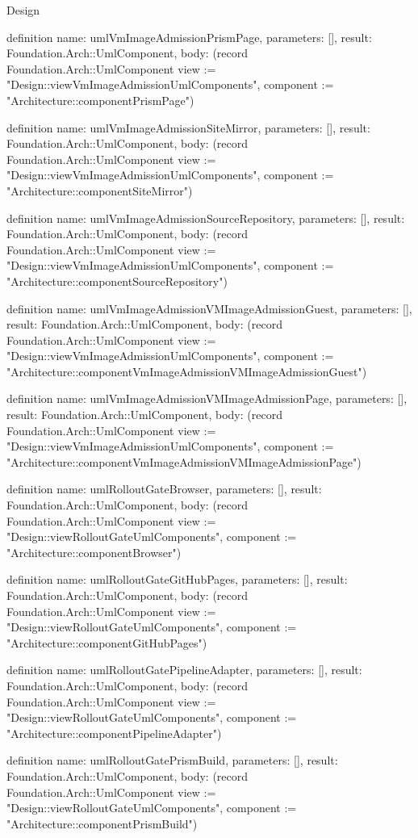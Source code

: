 \begin{lexlean}{Design}
\begin{semanticmodule}
definition{
  name: umlVmImageAdmissionPrismPage,
  parameters: [],
  result: Foundation.Arch::UmlComponent,
  body: (record Foundation.Arch::UmlComponent {view := "Design::viewVmImageAdmissionUmlComponents", component := "Architecture::componentPrismPage"})
}

definition{
  name: umlVmImageAdmissionSiteMirror,
  parameters: [],
  result: Foundation.Arch::UmlComponent,
  body: (record Foundation.Arch::UmlComponent {view := "Design::viewVmImageAdmissionUmlComponents", component := "Architecture::componentSiteMirror"})
}

definition{
  name: umlVmImageAdmissionSourceRepository,
  parameters: [],
  result: Foundation.Arch::UmlComponent,
  body: (record Foundation.Arch::UmlComponent {view := "Design::viewVmImageAdmissionUmlComponents", component := "Architecture::componentSourceRepository"})
}

definition{
  name: umlVmImageAdmissionVMImageAdmissionGuest,
  parameters: [],
  result: Foundation.Arch::UmlComponent,
  body: (record Foundation.Arch::UmlComponent {view := "Design::viewVmImageAdmissionUmlComponents", component := "Architecture::componentVmImageAdmissionVMImageAdmissionGuest"})
}

definition{
  name: umlVmImageAdmissionVMImageAdmissionPage,
  parameters: [],
  result: Foundation.Arch::UmlComponent,
  body: (record Foundation.Arch::UmlComponent {view := "Design::viewVmImageAdmissionUmlComponents", component := "Architecture::componentVmImageAdmissionVMImageAdmissionPage"})
}

definition{
  name: umlRolloutGateBrowser,
  parameters: [],
  result: Foundation.Arch::UmlComponent,
  body: (record Foundation.Arch::UmlComponent {view := "Design::viewRolloutGateUmlComponents", component := "Architecture::componentBrowser"})
}

definition{
  name: umlRolloutGateGitHubPages,
  parameters: [],
  result: Foundation.Arch::UmlComponent,
  body: (record Foundation.Arch::UmlComponent {view := "Design::viewRolloutGateUmlComponents", component := "Architecture::componentGitHubPages"})
}

definition{
  name: umlRolloutGatePipelineAdapter,
  parameters: [],
  result: Foundation.Arch::UmlComponent,
  body: (record Foundation.Arch::UmlComponent {view := "Design::viewRolloutGateUmlComponents", component := "Architecture::componentPipelineAdapter"})
}

definition{
  name: umlRolloutGatePrismBuild,
  parameters: [],
  result: Foundation.Arch::UmlComponent,
  body: (record Foundation.Arch::UmlComponent {view := "Design::viewRolloutGateUmlComponents", component := "Architecture::componentPrismBuild"})
}


\end{semanticmodule}
\end{lexlean}
